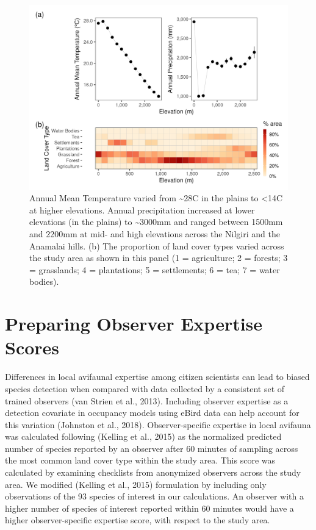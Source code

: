 \documentclass[]{article}
\begin{document}
\begin{figure}
\centering
\includegraphics{figs/fig_02_clim_lc_elev.png}
\caption{Annual Mean Temperature varied from \textasciitilde{}28C in the plains to \textless{}14C at higher elevations. Annual precipitation increased at lower elevations (in the plains) to \textasciitilde{}3000mm and ranged between 1500mm and 2200mm at mid- and high elevations across the Nilgiri and the Anamalai hills. (b) The proportion of land cover types varied across the study area as shown in this panel (1 = agriculture; 2 = forests; 3 = grasslands; 4 = plantations; 5 = settlements; 6 = tea; 7 = water bodies).}
\end{figure}

\hypertarget{preparing-observer-expertise-scores}{%
\section{Preparing Observer Expertise Scores}\label{preparing-observer-expertise-scores}}

Differences in local avifaunal expertise among citizen scientists can lead to biased species detection when compared with data collected by a consistent set of trained observers (van Strien et al., 2013). Including observer expertise as a detection covariate in occupancy models using eBird data can help account for this variation (Johnston et al., 2018). Observer-specific expertise in local avifauna was calculated following (Kelling et al., 2015) as the normalized predicted number of species reported by an observer after 60 minutes of sampling across the most common land cover type within the study area. This score was calculated by examining checklists from anonymized observers across the study area. We modified (Kelling et al., 2015) formulation by including only observations of the 93 species of interest in our calculations. An observer with a higher number of species of interest reported within 60 minutes would have a higher observer-specific expertise score, with respect to the study area.
\end{document}
